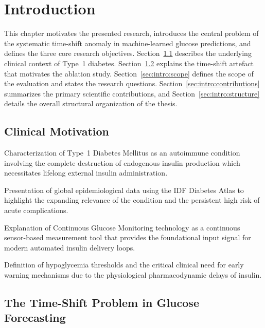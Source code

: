 \chapter{Introduction}
\label{ch:introduction}

This chapter motivates the presented research, introduces the central problem of the systematic time-shift anomaly in machine-learned glucose predictions, and defines the three core research objectives. Section~\ref{sec:intro:motivation} describes the underlying clinical context of Type~1 diabetes. Section~\ref{sec:intro:timeshift} explains the time-shift artefact that motivates the ablation study. Section~\ref{sec:intro:scope} defines the scope of the evaluation and states the research questions. Section~\ref{sec:intro:contributions} summarizes the primary scientific contributions, and Section~\ref{sec:intro:structure} details the overall structural organization of the thesis.

\section{Clinical Motivation}
\label{sec:intro:motivation}

\begin{planned}
    \item Characterization of Type~1 Diabetes Mellitus as an autoimmune condition involving the complete destruction of endogenous insulin production which necessitates lifelong external insulin administration.
    \item Presentation of global epidemiological data using the IDF Diabetes Atlas to highlight the expanding relevance of the condition and the persistent high risk of acute complications.
    \item Explanation of Continuous Glucose Monitoring technology as a continuous sensor-based measurement tool that provides the foundational input signal for modern automated insulin delivery loops.
    \item Definition of hypoglycemia thresholds and the critical clinical need for early warning mechanisms due to the physiological pharmacodynamic delays of insulin.
\end{planned}

\section{The Time-Shift Problem in Glucose Forecasting}
\label{sec:intro:timeshift}

